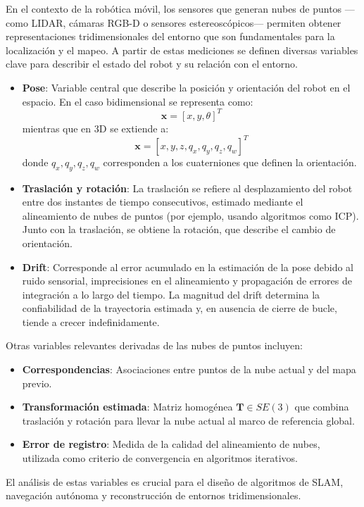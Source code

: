 \documentclass[12pt, a4paper, twoside]{article}
\begin{document}
En el contexto de la robótica móvil, los sensores que generan nubes de puntos —como LIDAR, cámaras RGB-D o sensores 
estereoscópicos— permiten obtener representaciones tridimensionales del entorno que son fundamentales para la localización 
y el mapeo. A partir de estas mediciones se definen diversas variables clave para describir el estado del robot y su relación con 
el entorno.

\begin{itemize}
  \item \textbf{Pose}: Variable central que describe la posición y orientación del robot en el espacio. En el caso bidimensional 
  se representa como:
  \[
  \mathbf{x} = [x, y, \theta]^{T}
  \]
  mientras que en 3D se extiende a:
  \[
  \mathbf{x} = [x, y, z, q_x, q_y, q_z, q_w]^{T}
  \]
  donde \( q_x, q_y, q_z, q_w \) corresponden a los cuaterniones que definen la orientación.
  \item \textbf{Traslación y rotación}: La traslación se refiere al desplazamiento del robot entre dos instantes de tiempo 
  consecutivos, estimado mediante el alineamiento de nubes de puntos (por ejemplo, usando algoritmos como ICP). Junto con la 
  traslación, se obtiene la rotación, que describe el cambio de orientación.
  \item \textbf{Drift}: Corresponde al error acumulado en la estimación de la pose debido al ruido sensorial, imprecisiones en 
  el alineamiento y propagación de errores de integración a lo largo del tiempo. La magnitud del drift determina la confiabilidad 
  de la trayectoria estimada y, en ausencia de cierre de bucle, tiende a crecer indefinidamente.
\end{itemize}
Otras variables relevantes derivadas de las nubes de puntos incluyen:
\begin{itemize}
    \item \textbf{Correspondencias}: Asociaciones entre puntos de la nube actual y del mapa previo.
    \item \textbf{Transformación estimada}: Matriz homogénea \( \mathbf{T} \in SE(3) \) que combina traslación y rotación para llevar la nube actual al marco de referencia global.
    \item \textbf{Error de registro}: Medida de la calidad del alineamiento de nubes, utilizada como criterio de convergencia en algoritmos iterativos.
\end{itemize}
El análisis de estas variables es crucial para el diseño de algoritmos de SLAM\cite{smith1987slam}, navegación autónoma y reconstrucción de entornos 
tridimensionales.
\end{document}
